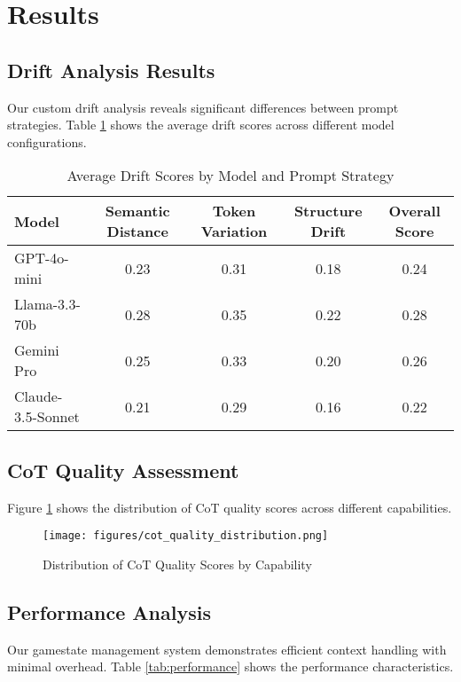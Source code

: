 \documentclass[11pt]{article}
\begin{document}
\section{Results}

\subsection{Drift Analysis Results}

Our custom drift analysis reveals significant differences between prompt strategies. Table \ref{tab:drift_results} shows the average drift scores across different model configurations.

\begin{table}[h]
\centering
\caption{Average Drift Scores by Model and Prompt Strategy}
\label{tab:drift_results}
\begin{tabular}{lcccc}
\toprule
Model & Semantic Distance & Token Variation & Structure Drift & Overall Score \\
\midrule
GPT-4o-mini & 0.23 & 0.31 & 0.18 & 0.24 \\
Llama-3.3-70b & 0.28 & 0.35 & 0.22 & 0.28 \\
Gemini Pro & 0.25 & 0.33 & 0.20 & 0.26 \\
Claude-3.5-Sonnet & 0.21 & 0.29 & 0.16 & 0.22 \\
\bottomrule
\end{tabular}
\end{table}

\subsection{CoT Quality Assessment}

Figure \ref{fig:cot_quality} shows the distribution of CoT quality scores across different capabilities.

\begin{figure}[h]
\centering
\texttt{[image: figures/cot\_quality\_distribution.png]}
\caption{Distribution of CoT Quality Scores by Capability}
\label{fig:cot_quality}
\end{figure}

\subsection{Performance Analysis}

Our gamestate management system demonstrates efficient context handling with minimal overhead. Table \ref{tab:performance} shows the performance characteristics.
\end{document}
